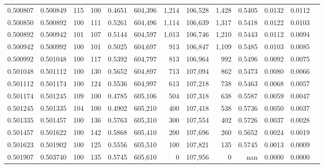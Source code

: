 \begin{tabular}{rrrrrrrrrrrrr}
0.500807 & 0.500849 &   115 & 100 &                                     0.4651 & 604,396 &   1,214 & 106,528 &   1,428 & 0.5405 & 0.0132 & 0.0112 \\
0.500850 & 0.500892 &   100 & 111 &                                     0.5261 & 604,496 &   1,114 & 106,639 &   1,317 & 0.5418 & 0.0122 & 0.0103 \\
0.500892 & 0.500942 &   101 & 107 &                                     0.5144 & 604,597 &   1,013 & 106,746 &   1,210 & 0.5443 & 0.0112 & 0.0094 \\
0.500942 & 0.500992 &   100 & 101 &                                     0.5025 & 604,697 &     913 & 106,847 &   1,109 & 0.5485 & 0.0103 & 0.0085 \\
0.500992 & 0.501048 &   100 & 117 &                                     0.5392 & 604,797 &     813 & 106,964 &     992 & 0.5496 & 0.0092 & 0.0075 \\
0.501048 & 0.501112 &   100 & 130 &                                     0.5652 & 604,897 &     713 & 107,094 &     862 & 0.5473 & 0.0080 & 0.0066 \\
0.501112 & 0.501174 &   100 & 124 &                                     0.5536 & 604,997 &     613 & 107,218 &     738 & 0.5463 & 0.0068 & 0.0057 \\
0.501174 & 0.501245 &   109 & 100 &                                     0.4785 & 605,106 &     504 & 107,318 &     638 & 0.5587 & 0.0059 & 0.0047 \\
0.501245 & 0.501335 &   104 & 100 &                                     0.4902 & 605,210 &     400 & 107,418 &     538 & 0.5736 & 0.0050 & 0.0037 \\
0.501335 & 0.501457 &   100 & 136 &                                     0.5763 & 605,310 &     300 & 107,554 &     402 & 0.5726 & 0.0037 & 0.0028 \\
0.501457 & 0.501622 &   100 & 142 &                                     0.5868 & 605,410 &     200 & 107,696 &     260 & 0.5652 & 0.0024 & 0.0019 \\
0.501623 & 0.501902 &   100 & 125 &                                     0.5556 & 605,510 &     100 & 107,821 &     135 & 0.5745 & 0.0013 & 0.0009 \\
0.501907 & 0.503740 &   100 & 135 &                                     0.5745 & 605,610 &       0 & 107,956 &       0 &    nan & 0.0000 & 0.0000 \\
\bottomrule
\end{tabular}
